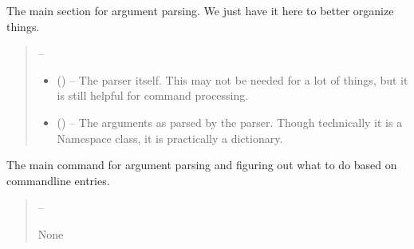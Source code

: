 \documentclass[letterpaper,11pt,english]{sphinxmanual}
\begin{document}
\begin{savenotes}\begin{fulllineitems}
\label{\detokenize{code/opihiexarata.__main__:opihiexarata.__main__.__main_parse_arguments}}
\pysigstartsignatures
{}
\pysigstopsignatures
\sphinxAtStartPar
The main section for argument parsing. We just have it here to better
organize things.
\begin{quote}\begin{description}
\sphinxAtStartPar
{} – 

\sphinxAtStartPar
\begin{itemize}
\item {} 
\sphinxAtStartPar
{} () – The parser itself. This may not be needed for a lot of things, but
it is still helpful for command processing.

\item {} 
\sphinxAtStartPar
{} () – The arguments as parsed by the parser. Though technically it is a
Namespace class, it is practically a dictionary.

\end{itemize}


\end{description}\end{quote}

\end{fulllineitems}\end{savenotes}


\begin{savenotes}\begin{fulllineitems}
\label{\detokenize{code/opihiexarata.__main__:opihiexarata.__main__.main}}
\pysigstartsignatures
{}
\pysigstopsignatures
\sphinxAtStartPar
The main command for argument parsing and figuring out what to do based
on command\sphinxhyphen{}line entries.
\begin{quote}\begin{description}
\sphinxAtStartPar
{} – 

\sphinxAtStartPar
None

\end{description}\end{quote}

\end{fulllineitems}\end{savenotes}
\end{document}
